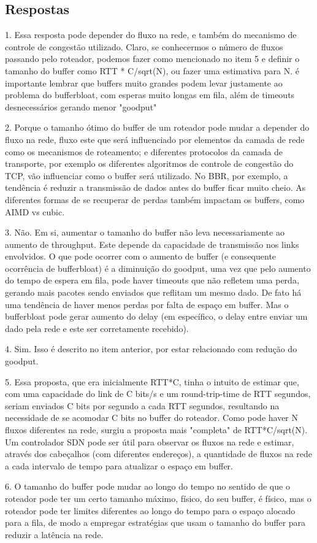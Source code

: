 \documentclass[a4paper,12pt]{article}
\begin{document}
\subsection{Respostas}

1. Essa resposta pode depender do fluxo na rede, e também do mecanismo de controle de congestão utilizado. Claro, se conhecermos o número de fluxos passando pelo roteador, podemos fazer como mencionado no item 5 e definir o tamanho do buffer como RTT * C/sqrt(N), ou fazer uma estimativa para N. é importante lembrar que buffers muito grandes podem levar justamente ao problema do bufferbloat, com esperas muito longas em fila, além de timeouts desnecessários gerando menor "goodput"

2. Porque o tamanho ótimo do buffer de um roteador pode mudar a depender do fluxo na rede, fluxo este que será influenciado por elementos da camada de rede como os mecanismos de roteamento; e diferentes protocolos da camada de transporte, por exemplo os diferentes algoritmos de controle de congestão do TCP, vão influenciar como o buffer será utilizado. No BBR, por exemplo, a tendência é reduzir a transmissão de dados antes do buffer ficar  muito cheio. As diferentes formas de se recuperar de perdas também impactam os buffers,  como AIMD vs cubic.

3. Não. Em si, aumentar o tamanho do buffer não leva necessariamente ao aumento de throughput. Este depende da capacidade de transmissão nos links envolvidos. O que pode ocorrer com o  aumento de buffer (e consequente ocorrência de bufferbloat) é a diminuição do goodput, uma vez que pelo aumento do tempo de espera em fila, pode haver timeouts que não refletem uma perda, gerando mais pacotes sendo enviados que reflitam um mesmo dado. De fato há uma tendência de haver menos perdas por falta de espaço em buffer. Mas o bufferbloat pode gerar aumento do delay (em específico, o delay entre enviar um dado pela rede e este ser corretamente recebido).

4. Sim. Isso é descrito no item anterior, por estar relacionado com redução do goodput.	

5. Essa proposta, que era inicialmente RTT*C, tinha o intuito de estimar que, com uma capacidade do link de C bits/s e um round-trip-time de RTT segundos, seriam enviados C bits por segundo a cada RTT segundos, resultando na necessidade de se acomodar C bits no buffer do roteador. Como  pode haver N fluxos diferentes na rede, surgiu a proposta mais "completa" de RTT*C/sqrt(N).  Um controlador SDN pode ser útil para observar os fluxos na rede e estimar, através dos cabeçalhos (com diferentes endereços), a quantidade de fluxos na rede a cada intervalo de tempo para atualizar o espaço em buffer.

6. O tamanho do buffer pode mudar ao longo do tempo no sentido de que o roteador pode ter um certo tamanho máximo, físico, do seu buffer, é físico, mas o roteador pode ter limites diferentes ao longo do tempo para  o espaço alocado para a fila, de modo a empregar estratégias que usam o tamanho do buffer para reduzir a latência na rede. 
\end{document}
